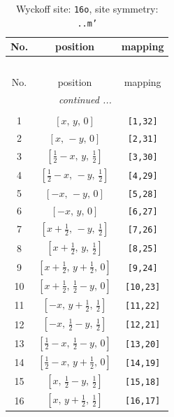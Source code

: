 \documentclass[fleqn,8pt]{jsarticle}
\begin{document}
\renewcommand{\arraystretch}{1.2}
\begin{longtable}{ccc}
\caption{Wyckoff site: {\tt 16o}, site symmetry: {\tt ..m'}}
 \\
 \hline \hline
No. & position & mapping \\ \hline \endfirsthead

\multicolumn{2}{l}{\tablename\ \thetable{}} \\
 \hline \hline
No. & position & mapping \\ \hline \endhead

 \hline \hline
\multicolumn{2}{r}{\footnotesize\it continued ...} \\ \endfoot

 \hline \hline
\multicolumn{2}{r}{} \\ \endlastfoot

1 & $\left[ x,\, y,\, 0 \right]$ & {\tt [1,32]} \\ \hline
2 & $\left[ x,\, - y,\, 0 \right]$ & {\tt [2,31]} \\ \hline
3 & $\left[ \frac{1}{2} - x,\, y,\, \frac{1}{2} \right]$ & {\tt [3,30]} \\ \hline
4 & $\left[ \frac{1}{2} - x,\, - y,\, \frac{1}{2} \right]$ & {\tt [4,29]} \\ \hline
5 & $\left[ - x,\, - y,\, 0 \right]$ & {\tt [5,28]} \\ \hline
6 & $\left[ - x,\, y,\, 0 \right]$ & {\tt [6,27]} \\ \hline
7 & $\left[ x + \frac{1}{2},\, - y,\, \frac{1}{2} \right]$ & {\tt [7,26]} \\ \hline
8 & $\left[ x + \frac{1}{2},\, y,\, \frac{1}{2} \right]$ & {\tt [8,25]} \\ \hline
9 & $\left[ x + \frac{1}{2},\, y + \frac{1}{2},\, 0 \right]$ & {\tt [9,24]} \\ \hline
10 & $\left[ x + \frac{1}{2},\, \frac{1}{2} - y,\, 0 \right]$ & {\tt [10,23]} \\ \hline
11 & $\left[ - x,\, y + \frac{1}{2},\, \frac{1}{2} \right]$ & {\tt [11,22]} \\ \hline
12 & $\left[ - x,\, \frac{1}{2} - y,\, \frac{1}{2} \right]$ & {\tt [12,21]} \\ \hline
13 & $\left[ \frac{1}{2} - x,\, \frac{1}{2} - y,\, 0 \right]$ & {\tt [13,20]} \\ \hline
14 & $\left[ \frac{1}{2} - x,\, y + \frac{1}{2},\, 0 \right]$ & {\tt [14,19]} \\ \hline
15 & $\left[ x,\, \frac{1}{2} - y,\, \frac{1}{2} \right]$ & {\tt [15,18]} \\ \hline
16 & $\left[ x,\, y + \frac{1}{2},\, \frac{1}{2} \right]$ & {\tt [16,17]} \\
\end{longtable}
\end{document}
